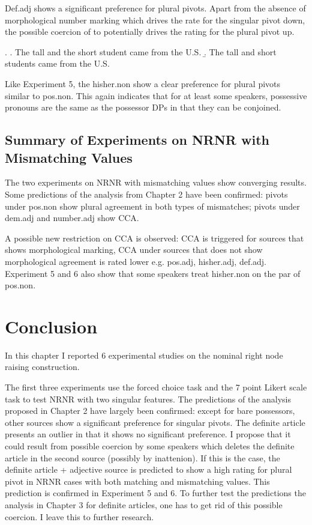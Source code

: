 \documentclass[
  11pt          %
  ,letterpaper  %
  ,center       %
  ,noupper      %
  ]{uconnthesis2}
\begin{document}
Def.adj shows a significant preference for plural pivots. Apart from the absence of morphological number marking which drives the rate for the singular pivot down, the possible coercion of \Next[a] to \Next[b] potentially drives the rating for the plural pivot up.

\ex. \a. The tall and the short student came from the U.S.
\b. The tall and short students came from the U.S.

Like Experiment 5, the hisher.non show a clear preference for plural pivots similar to pos.non. This again indicates that for at least some speakers, possessive pronouns are the same as the possessor DPs in that they can be conjoined. 

\subsection{Summary of Experiments on NRNR with Mismatching Values}

The two experiments on NRNR with mismatching values show converging results. Some predictions of the analysis from Chapter 2 have been confirmed: pivots under pos.non show plural agreement in both types of mismatches; pivots under dem.adj and number.adj show CCA. 

A possible new restriction on CCA is observed: CCA is triggered for sources that shows morphological marking, CCA under sources that does not show morphological agreement is rated lower e.g. pos.adj, hisher.adj, def.adj. Experiment 5 and 6 also show that some speakers treat hisher.non on the par of pos.non. 

\section{Conclusion}

In this chapter I reported 6 experimental studies on the nominal right node raising construction. 

The first three experiments use the forced choice task and the 7 point Likert scale task to test NRNR with two singular features. The predictions of the analysis proposed in Chapter 2 have largely been confirmed: except for bare possessors, other sources show a significant preference for singular pivots. The definite article presents an outlier in that it shows no significant preference. I propose that it could result from possible coercion by some speakers which deletes the definite article in the second source (possibly by inattenion). If this is the case, the definite article + adjective source is predicted to show a high rating for plural pivot in NRNR cases with both matching and mismatching values. This prediction is confirmed in Experiment 5 and 6. To further test the predictions the analysis in Chapter 3 for definite articles, one has to get rid of this possible coercion. I leave this to further research.
\end{document}
